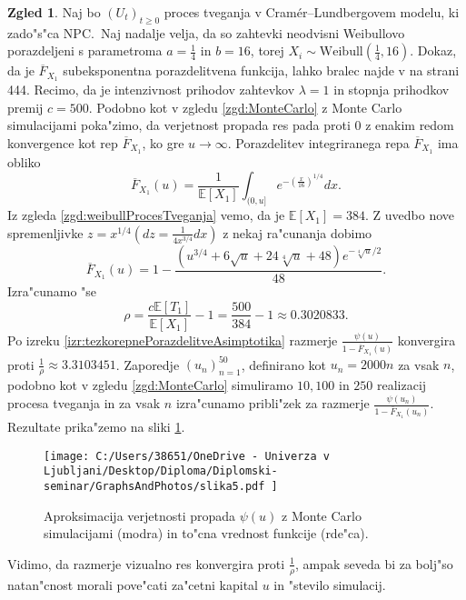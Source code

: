 \documentclass[12pt, a4paper, reqno]{amsart}
\theoremstyle{definition}
\newtheorem{zgled}[definicija]{Zgled}
\theoremstyle{plain}
\newcommand{\E}{\mathbb{E}}
\newcommand{\1}{\mathds{1}}
\begin{document}
        \begin{zgled}
        Naj bo $(U_t)_{t\geq0}$ proces tveganja v Cramér--Lundbergovem modelu, ki zado"s"ca NPC.\ Naj 
        nadalje velja, da so zahtevki neodvisni Weibullovo porazdeljeni s parametroma
        $a= \frac{1}{4}$ in $b= 16$, torej $X_i\sim\text{Weibull}(\frac{1}{4}, 16)$. 
        Dokaz, da je $\overline{F}_{X_1}$ subeksponentna porazdelitvena funkcija, lahko bralec 
        najde v \cite{9} na strani 444.
        Recimo, da je intenzivnost 
        prihodov zahtevkov $\lambda = 1$ in stopnja prihodkov premij $c = 500$.
        Podobno kot v zgledu \ref{zgd:MonteCarlo} z Monte Carlo simulacijami poka"zimo, da 
        verjetnost propada res pada proti $0$
        z enakim redom konvergence kot rep $\overline{F}_{X_1}$, ko gre $u\to\infty$. 
        Porazdelitev integriranega repa $\overline{F}_{X_1}$ ima obliko
        \begin{equation*}
            \overline{F}_{X_1}(u) = \frac{1}{\E\left[X_1\right]}\int_{(0, u]}e^{-\left(\tfrac{x}{16}\right)^{1/4}}dx.
        \end{equation*}
        Iz zgleda \ref{zgd:weibullProcesTveganja} vemo, da je $\E\left[X_1\right] = 384$. Z uvedbo nove spremenljivke
        $z = x^{1/4} (dz = \frac{1}{4x^{3/4}}dx)$ z nekaj ra"cunanja dobimo 
        \begin{equation*}
            \overline{F}_{X_1}(u) = 1 - \frac{\left(u^{3/4} + 6 \sqrt{u} + 24 \sqrt[4]{u} + 48\right)e^{-{\sqrt[4]{u}}/{2}}}{48}.
        \end{equation*}
        Izra"cunamo "se 
        \begin{equation*}
        \rho = \frac{c \E\left[T_1\right]}{\E\left[X_1\right]} - 1 = \frac{500}{384} - 1 \approx 0.3020833.
        \end{equation*}
        Po izreku \ref{izr:tezkorepnePorazdelitveAsimptotika} razmerje $\tfrac{\psi(u)}{1 - \overline{F}_{X_1}(u)}$ konvergira proti $\tfrac{1}{\rho} \approx 3.3103451$.
        Zaporedje $(u_n)_{n = 1}^{50}$, definirano kot $u_n = 2000n$ za vsak $n$, podobno kot v zgledu \ref{zgd:MonteCarlo} simuliramo $10, 100$ in $250$ realizacij
        procesa tveganja in za vsak $n$ izra"cunamo pribli"zek za razmerje $\tfrac{\psi(u_n)}{1 - \overline{F}_{X_1}(u_n)}$.
        Rezultate prika"zemo na sliki \ref{fig:slika5}.
       
        \begin{figure}[H]       
            \centering
            \texttt{[image: 
                C:/Users/38651/OneDrive - Univerza v Ljubljani/Desktop/Diploma/Diplomski-seminar/GraphsAndPhotos/slika5.pdf
                ]}
            \caption{Aproksimacija verjetnosti propada $\psi(u)$ z Monte Carlo simulacijami (modra) in 
            to"cna vrednost funkcije (rde"ca).}
            \label{fig:slika5}
        \end{figure}

        \noindent
        Vidimo, da razmerje vizualno res konvergira proti $\tfrac{1}{\rho}$, ampak seveda bi 
        za bolj"so natan"cnost morali pove"cati za"cetni kapital $u$ in "stevilo simulacij. 
        \label{zg:MonteCarloTezkiRepi}
        \end{zgled}
\end{document}
